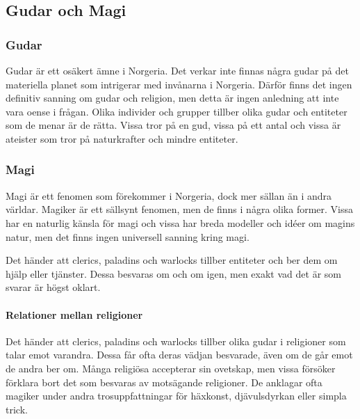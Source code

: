 \subsection{Gudar och Magi}
\subsubsection{Gudar}
Gudar är ett osäkert ämne i Norgeria. Det verkar inte finnas några gudar på det materiella planet som intrigerar med invånarna i Norgeria. Därför finns det ingen definitiv sanning om gudar och religion, men detta är ingen anledning att inte vara oense i frågan. Olika individer och grupper tillber olika gudar och entiteter som de menar är de rätta. Vissa tror på en gud, vissa på ett antal och vissa är ateister som tror på naturkrafter och mindre entiteter. 

\subsubsection{Magi}
Magi är ett fenomen som förekommer i Norgeria, dock mer sällan än i andra världar. Magiker är ett sällsynt fenomen, men de finns i några olika former. Vissa har en naturlig känsla för magi och vissa har breda modeller och idéer om magins natur, men det finns ingen universell sanning kring magi. 

Det händer att clerics, paladins och warlocks tillber entiteter och ber dem om hjälp eller tjänster. Dessa besvaras om och om igen, men exakt vad det är som svarar är högst oklart.

\paragraph{Relationer mellan religioner}
Det händer att clerics, paladins och warlocks tillber olika gudar i religioner som talar emot varandra. Dessa får ofta deras vädjan besvarade, även om de går emot de andra ber om. Många religiösa accepterar sin ovetskap, men vissa försöker förklara bort det som besvaras av motsägande religioner. De anklagar ofta magiker under andra trosuppfattningar för häxkonst, djävulsdyrkan eller simpla trick.
